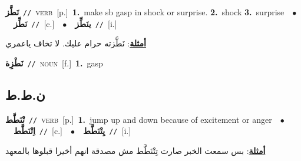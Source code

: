 \documentclass[10pt,a4paper,twoside]{article} %
\begin{document}
\begin{multicols}{2}
{\setlength\topsep{0pt}\textbf{\foreignlanguage{arabic}{نَطَّز}}\ {\color{gray}\texttt{//}\color{black}}\ \textsc{verb}\ [p.]\ \textbf{1.}~make sb gasp in shock or surprise.  \textbf{2.}~shock  \textbf{3.}~surprise\ \ $\bullet$\ \ \setlength\topsep{0pt}\textbf{\foreignlanguage{arabic}{نَطِّز}}\ {\color{gray}\texttt{//}\color{black}}\ [c.]\ \ $\bullet$\ \ \setlength\topsep{0pt}\textbf{\foreignlanguage{arabic}{ينَطِّز}}\ {\color{gray}\texttt{//}\color{black}}\ [i.]\  \begin{flushright}\color{gray}\foreignlanguage{arabic}{\textbf{\underline{\foreignlanguage{arabic}{أمثلة}}}: نَطَّزته حرام عليك. لا تخاف ياعمري}\end{flushright}\color{black}} \vspace{2mm}

{\setlength\topsep{0pt}\textbf{\foreignlanguage{arabic}{نَطْزِة}}\ {\color{gray}\texttt{//}\color{black}}\ \textsc{noun}\ [f.]\ \textbf{1.}~gasp\ } \vspace{2mm}

\vspace{-3mm}
\subsection*{\color{blue}\foreignlanguage{arabic}{ن.ط.ط}\color{blue}{}} 

{\setlength\topsep{0pt}\textbf{\foreignlanguage{arabic}{تْنَطَّط}}\ {\color{gray}\texttt{//}\color{black}}\ \textsc{verb}\ [p.]\ \textbf{1.}~jump up and down because of excitement or anger\ \ $\bullet$\ \ \setlength\topsep{0pt}\textbf{\foreignlanguage{arabic}{اِتْنَطَّط}}\ {\color{gray}\texttt{//}\color{black}}\ [c.]\ \ $\bullet$\ \ \setlength\topsep{0pt}\textbf{\foreignlanguage{arabic}{يِتْنَطَّط}}\ {\color{gray}\texttt{//}\color{black}}\ [i.]\  \begin{flushright}\color{gray}\foreignlanguage{arabic}{\textbf{\underline{\foreignlanguage{arabic}{أمثلة}}}: بس سمعت الخبر صارت تِتْنَطَّط مش مصدقة انهم أخيرا قبلوها بالمعهد}\end{flushright}\color{black}} \vspace{2mm}


\end{multicols}
\end{document}
